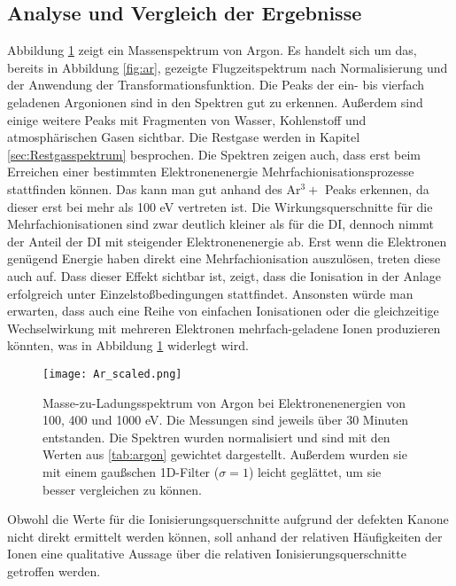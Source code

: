 \subsection{Analyse und Vergleich der Ergebnisse}
\label{sec:Analyse}
Abbildung \ref{fig:ar_scaled} zeigt ein Massenspektrum von Argon. Es handelt sich um das, bereits in Abbildung \ref{fig:ar}, gezeigte Flugzeitspektrum nach Normalisierung und der Anwendung der Transformationsfunktion. Die Peaks der ein- bis vierfach geladenen Argonionen sind in den Spektren gut zu erkennen. Außerdem sind einige weitere Peaks mit Fragmenten von Wasser, Kohlenstoff und atmosphärischen Gasen sichtbar. Die Restgase werden in Kapitel \ref{sec:Restgasspektrum} besprochen. Die Spektren zeigen auch, dass erst beim Erreichen einer bestimmten Elektronenenergie Mehrfachionisationsprozesse stattfinden können. Das kann man gut anhand des Ar$^3+$ Peaks erkennen, da dieser erst bei mehr als 100 eV vertreten ist. Die Wirkungsquerschnitte für die Mehrfachionisationen sind zwar deutlich kleiner als für die DI, dennoch nimmt der Anteil der DI mit steigender Elektronenenergie ab. Erst wenn die Elektronen genügend Energie haben direkt eine Mehrfachionisation auszulösen, treten diese auch auf. Dass dieser Effekt sichtbar ist, zeigt, dass die Ionisation in der Anlage erfolgreich unter Einzelstoßbedingungen stattfindet. Ansonsten würde man erwarten, dass auch eine Reihe von einfachen Ionisationen oder die gleichzeitige Wechselwirkung mit mehreren Elektronen mehrfach-geladene Ionen produzieren könnten, was in Abbildung \ref{fig:ar_scaled} widerlegt wird. 

\begin{landscape}
    \begin{figure}
        \centering
        \hspace*{-3cm}\texttt{[image: Ar\_scaled.png]}
        \caption[Skaliertes Massenspektrum von Argon bei verschiedenen Elektronenenergien]{Masse-zu-Ladungsspektrum von Argon bei Elektronenenergien von 100, 400 und 1000 eV. Die Messungen sind jeweils über 30 Minuten entstanden. Die Spektren wurden normalisiert und sind mit den Werten aus \ref{tab:argon} gewichtet dargestellt. Außerdem wurden sie mit einem gaußschen 1D-Filter ($\sigma = 1$) leicht geglättet, um sie besser vergleichen zu können.}
        \label{fig:ar_scaled}
    \end{figure}
\end{landscape}

Obwohl die Werte für die Ionisierungsquerschnitte aufgrund der defekten Kanone nicht direkt ermittelt werden können, soll anhand der relativen Häufigkeiten der Ionen eine qualitative Aussage über die relativen Ionisierungsquerschnitte getroffen werden. 

